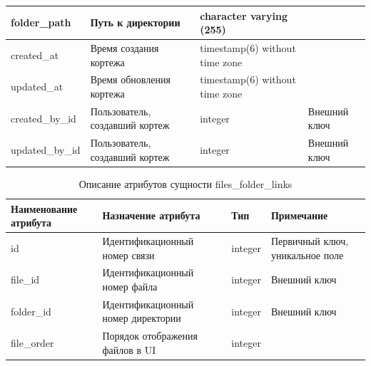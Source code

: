 \documentclass{mirea}
\begin{document}
\begin{longtable}{ |p{}|p{}|p{}|p{}| }
		folder\_path & Путь к директории & character varying (255) & \\ \hline
		
		created\_at & Время создания кортежа & timestamp(6) without time zone & \\ \hline
		
		updated\_at & Время обновления кортежа & timestamp(6) without time zone & \\ \hline
		
		created\_by\_id & Пользователь, создавший кортеж & integer & Внешний ключ \\ \hline
		
		updated\_by\_id & Пользователь, создавший кортеж & integer & Внешний ключ \\ \hline
		
	\end{longtable}

	\begin{longtable}{ |p{}|p{}|p{}|p{}| } 
		\caption{Описание атрибутов сущности files\_folder\_links}
		\endfirsthead
		\endhead
		\hline
		Наименование атрибута & Назначение атрибута & Тип & Примечание \\ \hline
		
		id & Идентификацион\-ный номер связи & integer & Первичный ключ, уникальное поле \\ \hline
		
		file\_id & Идентификацион\-ный номер файла & integer & Внешний ключ \\ \hline
		
		folder\_id & Идентификацион\-ный номер директории & integer & Внешний ключ \\ \hline
		
		file\_order & Порядок отображения файлов в UI & integer & \\ \hline
		
	\end{longtable}
\end{document}
